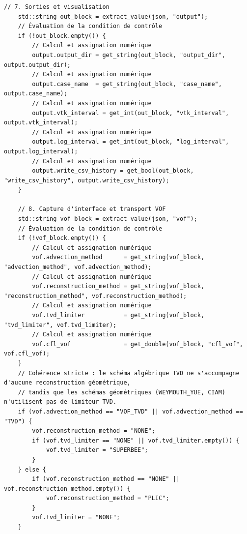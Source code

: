 \documentclass[10pt,a4paper,oneside]{book}
\begin{document}
\begin{lstlisting}[language={[11]C++}]
    // 7. Sorties et visualisation
    std::string out_block = extract_value(json, "output");
    // Évaluation de la condition de contrôle
    if (!out_block.empty()) {
        // Calcul et assignation numérique
        output.output_dir = get_string(out_block, "output_dir", output.output_dir);
        // Calcul et assignation numérique
        output.case_name  = get_string(out_block, "case_name", output.case_name);
        // Calcul et assignation numérique
        output.vtk_interval = get_int(out_block, "vtk_interval", output.vtk_interval);
        // Calcul et assignation numérique
        output.log_interval = get_int(out_block, "log_interval", output.log_interval);
        // Calcul et assignation numérique
        output.write_csv_history = get_bool(out_block, "write_csv_history", output.write_csv_history);
    }

    // 8. Capture d'interface et transport VOF
    std::string vof_block = extract_value(json, "vof");
    // Évaluation de la condition de contrôle
    if (!vof_block.empty()) {
        // Calcul et assignation numérique
        vof.advection_method      = get_string(vof_block, "advection_method", vof.advection_method);
        // Calcul et assignation numérique
        vof.reconstruction_method = get_string(vof_block, "reconstruction_method", vof.reconstruction_method);
        // Calcul et assignation numérique
        vof.tvd_limiter           = get_string(vof_block, "tvd_limiter", vof.tvd_limiter);
        // Calcul et assignation numérique
        vof.cfl_vof               = get_double(vof_block, "cfl_vof", vof.cfl_vof);
    }
    // Cohérence stricte : le schéma algébrique TVD ne s'accompagne d'aucune reconstruction géométrique,
    // tandis que les schémas géométriques (WEYMOUTH_YUE, CIAM) n'utilisent pas de limiteur TVD.
    if (vof.advection_method == "VOF_TVD" || vof.advection_method == "TVD") {
        vof.reconstruction_method = "NONE";
        if (vof.tvd_limiter == "NONE" || vof.tvd_limiter.empty()) {
            vof.tvd_limiter = "SUPERBEE";
        }
    } else {
        if (vof.reconstruction_method == "NONE" || vof.reconstruction_method.empty()) {
            vof.reconstruction_method = "PLIC";
        }
        vof.tvd_limiter = "NONE";
    }


\end{lstlisting}
\end{document}

